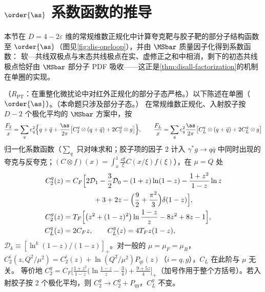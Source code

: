 \section{$\order{\as}$ 系数函数的推导}\label{sec:disall-nlo}

本节在 $D=4-2\varepsilon$ 维的常规维数正规化中计算夸克靶与胶子靶的部分子结构函数至 $\order{\as}$（图见\cref{fig:dis-oneloop}），并由 $\MSbar$ 质量因子化得到系数函数：
软—共线双极点与末态共线极点在实、虚修正之和中相消，剩下的初态共线极点恰好由 $\MSbar$ 部分子 PDF 吸收——这正是\cref{thm:disall-factorization}的机制在单圈的实现。

\begin{proposition}\label{prop:disall-nlo}
（$R_{\mathrm{PT}}$：在重整化微扰论中对红外正规化的部分子态严格。）以下陈述在单圈（$\order{\as}$）。（本命题只涉及部分子态。）
在常规维数正规化、入射胶子按 $D-2$ 个极化平均的 $\MSbar$ 方案中，按
\begin{equation}\label{eq:disall-norm}
\frac{F_2}{x}=\sum_qe_q^2\Big\{q+\bar q+\frac{\as}{2\pi}\big[C_2^q\otimes(q+\bar q)+2C_2^g\otimes g\big]\Big\},\qquad
\frac{F_L}{x}=\sum_qe_q^2\frac{\as}{2\pi}\big[C_L^q\otimes(q+\bar q)+2C_L^g\otimes g\big]
\end{equation}
归一化系数函数（$\sum_q$ 只对味求和；胶子项的因子 $2$ 计入 $\gamma^*g\to q\bar q$ 中同时出现的夸克与反夸克；$(C\otimes f)(x)=\int_x^1\frac{\dd\xi}\xi C(x/\xi)f(\xi)$），在 $\mu=Q$ 处
\begin{equation}\label{eq:disall-C}
\begin{aligned}
C_2^q(z)&=C_F\Big[2\mathcal D_1-\frac32\mathcal D_0-(1+z)\ln(1-z)-\frac{1+z^2}{1-z}\ln z\\
&\hspace{4.2em}+3+2z-\Big(\frac92+\frac{\pi^2}3\Big)\delta(1-z)\Big],\\
C_2^g(z)&=T_F\Big[\big(z^2+(1-z)^2\big)\ln\frac{1-z}{z}-8z^2+8z-1\Big],\\
C_L^q(z)&=2C_Fz,\qquad C_L^g(z)=4T_Fz(1-z),
\end{aligned}   %
\end{equation}
$\mathcal D_k\equiv[\ln^k(1-z)/(1-z)]_+$。对一般的 $\mu=\mu_F=\mu_R$，$C_2^i(z,Q^2/\mu^2)=C_2^i(z)+\ln(Q^2/\mu^2)P_{qi}(z)$（$i=q,g$），$C_L$ 在此阶与 $\mu$ 无关。
等价地 $C_2^q=C_F\big[\frac{1+z^2}{1-z}\big(\ln\frac{1-z}z-\frac34\big)+\frac{9+5z}4\big]_+$（加号作用于整个方括号）。若入射胶子按 2 个极化平均，则 $C_2^g\to C_2^g+P_{qg}$，$C_L^g$ 不变。
\end{proposition}

